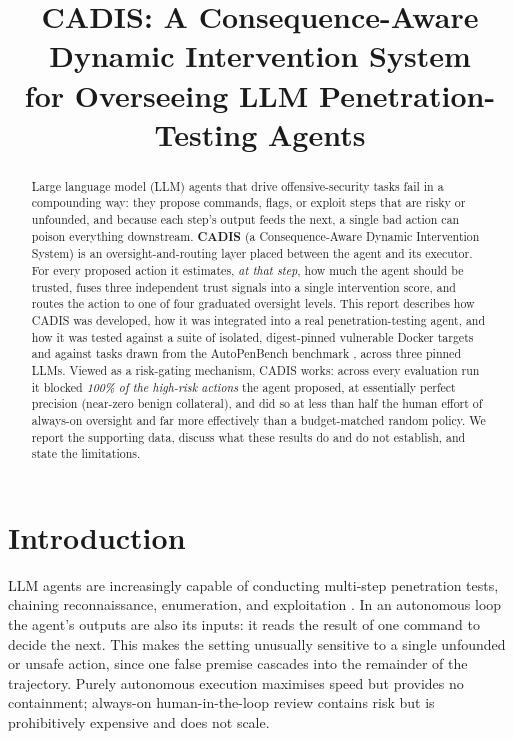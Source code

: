 \documentclass[11pt]{article}
\title{\textbf{CADIS: A Consequence-Aware Dynamic Intervention System\\ for Overseeing LLM Penetration-Testing Agents}}
\author{}
\date{}
\begin{document}
\maketitle

\begin{abstract}
Large language model (LLM) agents that drive offensive-security tasks fail in a compounding way:
they propose commands, flags, or exploit steps that are risky or unfounded, and because each step's
output feeds the next, a single bad action can poison everything downstream. \textbf{CADIS} (a
Consequence-Aware Dynamic Intervention System) is an oversight-and-routing layer placed between the
agent and its executor. For every proposed action it estimates, \emph{at that step}, how much the
agent should be trusted, fuses three independent trust signals into a single intervention score, and
routes the action to one of four graduated oversight levels. This report describes how CADIS was
developed, how it was integrated into a real penetration-testing agent, and how it was tested against
a suite of isolated, digest-pinned vulnerable Docker targets and against tasks drawn from the
AutoPenBench benchmark \citep{gioacchini2024autopenbench}, across three pinned LLMs. Viewed as a
risk-gating mechanism, CADIS works: across every evaluation run it blocked \emph{100\% of the
high-risk actions} the agent proposed, at essentially perfect precision (near-zero benign collateral),
and did so at less than half the human effort of always-on oversight and far more effectively than a
budget-matched random policy. We report the supporting data, discuss what these results do and do not
establish, and state the limitations.
\end{abstract}

\section{Introduction}
LLM agents are increasingly capable of conducting multi-step penetration tests, chaining reconnaissance,
enumeration, and exploitation \citep{deng2024pentestgpt,happe2023pwned}. In an autonomous loop the agent's
outputs are also its inputs: it reads the result of one command to decide the next. This makes the
setting unusually sensitive to a single unfounded or unsafe action, since one false premise cascades
into the remainder of the trajectory. Purely autonomous execution maximises speed but provides no
containment; always-on human-in-the-loop review contains risk but is prohibitively expensive and does
not scale.
\end{document}
